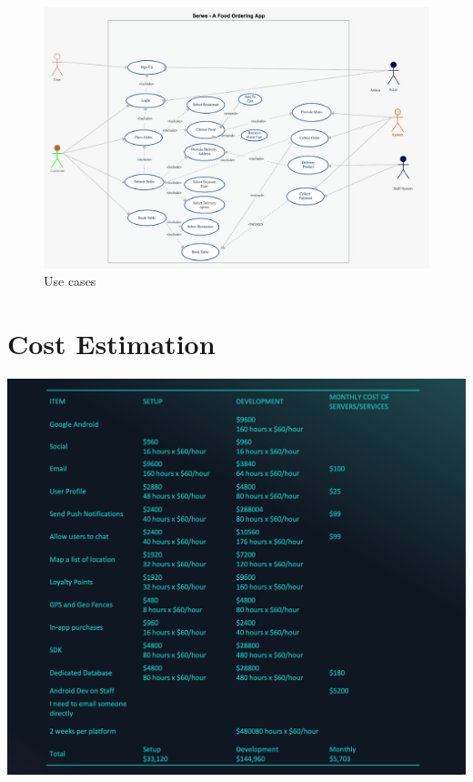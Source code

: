 \documentclass[12pt]{article}
\begin{document}
\begin{figure}
\centering
\includegraphics[scale=0.3]{WhatsApp Image 2020-08-17 at 9.15.41 PM.jpeg}
\caption{Use cases}
\end{figure}

\section{Cost Estimation}
\includegraphics[scale=0.5]{cost.png}







\end{document}
